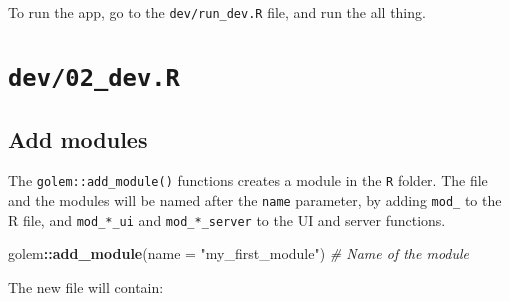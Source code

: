 \documentclass[]{book}
\newenvironment{Shaded}{\begin{snugshade}}{\end{snugshade}}
\newcommand{\CommentTok}[1]{\textcolor[rgb]{0.56,0.35,0.01}{\textit{#1}}}
\newcommand{\ControlFlowTok}[1]{\textcolor[rgb]{0.13,0.29,0.53}{\textbf{#1}}}
\newcommand{\DataTypeTok}[1]{\textcolor[rgb]{0.13,0.29,0.53}{#1}}
\newcommand{\KeywordTok}[1]{\textcolor[rgb]{0.13,0.29,0.53}{\textbf{#1}}}
\newcommand{\NormalTok}[1]{#1}
\newcommand{\OperatorTok}[1]{\textcolor[rgb]{0.81,0.36,0.00}{\textbf{#1}}}
\newcommand{\StringTok}[1]{\textcolor[rgb]{0.31,0.60,0.02}{#1}}
\begin{document}
To run the app, go to the \texttt{dev/run\_dev.R} file, and run the all thing.

\hypertarget{dev02_dev.r}{%
\section{\texorpdfstring{\texttt{dev/02\_dev.R}}{dev/02\_dev.R}}\label{dev02_dev.r}}

\hypertarget{add-modules}{%
\subsection{Add modules}\label{add-modules}}

The \texttt{golem::add\_module()} functions creates a module in the \texttt{R} folder. The file and the modules will be named after the \texttt{name} parameter, by adding \texttt{mod\_} to the R file, and \texttt{mod\_*\_ui} and \texttt{mod\_*\_server} to the UI and server functions.

\begin{Shaded}
\begin{Highlighting}[]
\NormalTok{golem}\OperatorTok{::}\KeywordTok{add_module}\NormalTok{(}\DataTypeTok{name =} \StringTok{"my_first_module"}\NormalTok{) }\CommentTok{# Name of the module}
\end{Highlighting}
\end{Shaded}

The new file will contain:

\begin{Shaded}
\end{Shaded}
\end{document}
